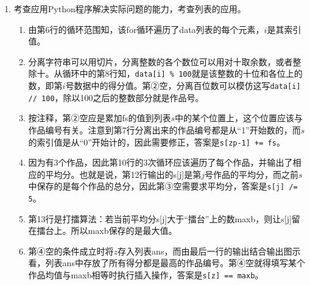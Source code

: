 \begin{enumerate}
\item 考查应用Python程序解决实际问题的能力，考查列表的应用。
	\begin{enumerate}[label=$(\alph*)$]
\setcounter{qnumber}{1}
\begin{lstlisting}[numbers=left]
import random as rd
data = [180,283,385,170,276,384,180,285,380,190,295,390,170,272,372]
s = [0, 0, 0]                   # 存储3个作品的得分
ans = []                        # 存储并列最高平均分的作品号
maxb = 0
for i in range(len(data)):
    zp = `\clozeblank{2}`   # 分离出作品编号
    fs = data[i] % 100
    `\clozeblank{2}`        # 累加当前作品的得分
for j in range(3):
    `\clozeblank{2}`
    print("作品", j+1, "平均分为", s[j])
    if s[j] > maxb:
        maxb = s[j]
for z in range(3):              # 查找并列最高平均分
    if `\clozeblank{2}`:
        ans.append(z + 1)       # 将数据添加到列表ans尾部
print("平均分最高作品号是: ", ans)
\end{lstlisting}
	\item 由第6行的循环范围知，该for循环遍历了data列表的每个元素，$i$是其索引值。
	\item 分离字符串可以用切片，分离整数的各个数位可以用对十取余数，或者整除十。从循环中的第8行知，\lstinline|data[i] % 100|就是该整数的十位和各位上的数，即第$i$号数据中的得分值。第②空，分离百位数可以模仿这写\lstinline|data[i] // 100|，除以100之后的整数部分就是作品号。
	\item 按注释，第②空应是累加fs的值到列表$s$中的某个位置上，这个位置应该与作品编号有关。注意到第7行分离出来的作品编号都是从“1”开始数的，而$s$的索引值是从“0”开始计的，因此需要修正，答案是\lstinline|s[zp-1] += fs|。
	\item 因为有3个作品，因此第10行的3次循环应该遍历了每个作品，并输出了相应的平均分。也就是说，第12行输出的s[j]是第$j$号作品的平均分，而之前$s$中保存的是每个作品的总分，因此第③空需要求平均分，答案是\lstinline|s[j] /= 5|。
	\item 第13行是打擂算法：若当前平均分s[j]大于“擂台”上的数maxb，则让s[j]留在擂台上。所以maxb保存的是最大值。
	\item 第④空的条件成立时将$z$存入列表ans，而由最后一行的输出结合输出图示看，列表ans中存放了所有得分都是最高的作品编号。第④空就得填写某个作品均值与maxb相等时执行插入操作，答案是\lstinline|s[z] == maxb|。
	\end{enumerate}






































\end{enumerate}


\newpage
